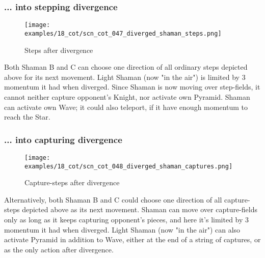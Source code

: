 \subsubsection*{... into stepping divergence}
\label{sec:Conquest of Tlalocan/Divergence/... into stepping divergence}

\vspace*{-1.4\baselineskip}
\noindent
\begin{figure}[!h]
\texttt{[image: examples/18\_cot/scn\_cot\_047\_diverged\_shaman\_steps.png]}
\vspace*{-1.4\baselineskip}
\caption{Steps after divergence}
\label{fig:scn_cot_047_diverged_shaman_steps}
\end{figure}

\vspace*{-0.4\baselineskip}
Both Shaman B and C can choose one direction of all ordinary steps depicted above
for its next movement. Light Shaman (now "in the air") is limited by 3 momentum it
had when diverged.\newline
\indent
Since Shaman is now moving over step-fields, it cannot neither capture opponent's
Knight, nor activate own Pyramid. Shaman can activate own Wave; it could also
teleport, if it have enough momentum to reach the Star.

\clearpage %

\subsubsection*{... into capturing divergence}
\label{sec:Conquest of Tlalocan/Divergence/... into capturing divergence}

\vspace*{-1.4\baselineskip}
\noindent
\begin{figure}[!h]
\texttt{[image: examples/18\_cot/scn\_cot\_048\_diverged\_shaman\_captures.png]}
\vspace*{-1.4\baselineskip}
\caption{Capture-steps after divergence}
\label{fig:scn_cot_048_diverged_shaman_captures}
\end{figure}

\vspace*{-0.4\baselineskip}
Alternatively, both Shaman B and C could choose one direction of all capture-steps
depicted above as its next movement. Shaman can move over capture-fields only as
long as it keeps capturing opponent's pieces, and here it's limited by 3 momentum
it had when diverged.\newline
\indent
Light Shaman (now "in the air") can also activate Pyramid in addition to Wave,
either at the end of a string of captures, or as the only action after divergence.

